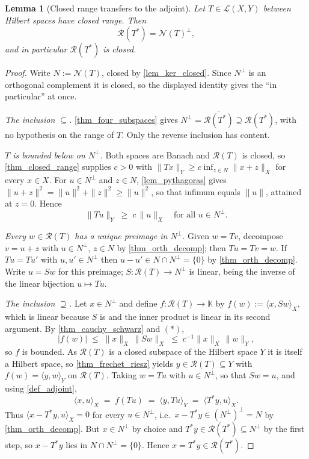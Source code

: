 \documentclass[a4paper]{report}
\theoremstyle{plain}
\newtheorem{lemma}[theorem]{Lemma}
\theoremstyle{definition}
\theoremstyle{remark}
\begin{document}
\begin{lemma}[Closed range transfers to the adjoint]
  \label{lem_closed_range_adjoint}
  Let $T \in \mathcal{L}(X,Y)$ between Hilbert spaces have closed range.  Then
  \[
    \mathcal{R}(T^*) = \mathcal{N}(T)^\perp ,
  \]
  and in particular $\mathcal{R}(T^*)$ is closed.
\end{lemma}
\begin{proof}
  Write $N := \mathcal{N}(T)$, closed by \cref{lem_ker_closed}.  Since $N^\perp$ is an
  orthogonal complement it is closed, so the displayed identity gives the ``in
  particular'' at once.

  \emph{The inclusion $\subseteq$.}  \cref{thm_four_subspaces} gives
  $N^\perp = \overline{\mathcal{R}(T^*)} \supseteq \mathcal{R}(T^*)$, with no hypothesis
  on the range of $T$.  Only the reverse inclusion has content.

  \emph{$T$ is bounded below on $N^\perp$.}  Both spaces are Banach and
  $\mathcal{R}(T)$ is closed, so \cref{thm_closed_range} supplies $c > 0$ with
  $\|Tx\|_Y \ge c\inf_{z \in N}\|x+z\|_X$ for every $x \in X$.  For $u \in N^\perp$ and
  $z \in N$, \cref{lem_pythagoras} gives $\|u+z\|^2 = \|u\|^2 + \|z\|^2 \ge \|u\|^2$, so
  that infimum equals $\|u\|$, attained at $z = 0$.  Hence
  \begin{equation}
    \|Tu\|_Y \;\ge\; c\,\|u\|_X \quad \text{for all } u \in N^\perp . \tag{$*$}
  \end{equation}

  \emph{Every $w \in \mathcal{R}(T)$ has a unique preimage in $N^\perp$.}  Given
  $w = Tv$, decompose $v = u + z$ with $u \in N^\perp$, $z \in N$ by
  \cref{thm_orth_decomp}; then $Tu = Tv = w$.  If $Tu = Tu'$ with $u,u' \in N^\perp$ then
  $u - u' \in N \cap N^\perp = \{0\}$ by \cref{thm_orth_decomp}.  Write $u = Sw$ for this
  preimage; $S : \mathcal{R}(T) \to N^\perp$ is linear, being the inverse of the linear
  bijection $u \mapsto Tu$.

  \emph{The inclusion $\supseteq$.}  Let $x \in N^\perp$ and define
  $f : \mathcal{R}(T) \to \mathbb{K}$ by $f(w) := \langle x, Sw\rangle_X$, which is linear
  because $S$ is and the inner product is linear in its second argument.  By
  \cref{thm_cauchy_schwarz} and $(*)$,
  \[
    |f(w)| \;\le\; \|x\|_X\,\|Sw\|_X \;\le\; c^{-1}\|x\|_X\,\|w\|_Y ,
  \]
  so $f$ is bounded.  As $\mathcal{R}(T)$ is a closed subspace of the Hilbert space $Y$
  it is itself a Hilbert space, so \cref{thm_frechet_riesz} yields
  $y \in \mathcal{R}(T) \subseteq Y$ with $f(w) = \langle y, w\rangle_Y$ on
  $\mathcal{R}(T)$.  Taking $w = Tu$ with $u \in N^\perp$, so that $Sw = u$, and using
  \cref{def_adjoint},
  \[
    \langle x, u\rangle_X \;=\; f(Tu) \;=\; \langle y, Tu\rangle_Y
      \;=\; \langle T^*y, u\rangle_X .
  \]
  Thus $\langle x - T^*y, u\rangle_X = 0$ for every $u \in N^\perp$, i.e.\
  $x - T^*y \in (N^\perp)^\perp = N$ by \cref{thm_orth_decomp}.  But $x \in N^\perp$ by
  choice and $T^*y \in \mathcal{R}(T^*) \subseteq N^\perp$ by the first step, so
  $x - T^*y$ lies in $N \cap N^\perp = \{0\}$.  Hence $x = T^*y \in \mathcal{R}(T^*)$.
\end{proof}
\end{document}
